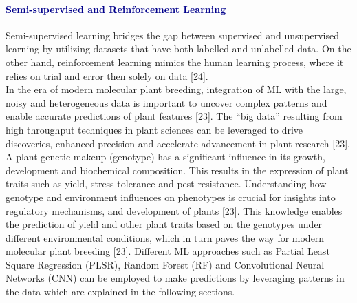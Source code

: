 \documentclass[12pt,a4paper]{report}
\begin{document}
\paragraph{\textcolor{darkblue}{Semi-supervised and Reinforcement Learning}}
Semi-supervised learning bridges the gap between supervised and unsupervised learning by utilizing datasets that have both labelled and unlabelled data. On the other hand, reinforcement learning mimics the human learning process, where it relies on trial and error then solely on data [24]. \\

In the era of modern molecular plant breeding, integration of ML with the large, noisy and heterogeneous data is important to uncover complex patterns and enable accurate predictions of plant features [23]. The “big data” resulting from high throughput techniques in plant sciences can be leveraged 
to drive discoveries, enhanced precision and accelerate advancement in plant research [23]. A plant genetic makeup (genotype) has a significant influence in its growth, development and biochemical composition. This results in the expression of plant traits such as yield, stress tolerance and pest resistance. 
Understanding how genotype and environment influences on phenotypes is crucial for insights into regulatory mechanisms, and development of plants [23]. This knowledge enables the  prediction of yield and other plant traits based on the genotypes under different environmental conditions, which in turn paves the 
way for modern molecular plant breeding [23]. Different ML approaches such as Partial Least Square Regression (PLSR), Random Forest (RF) and Convolutional Neural Networks (CNN)  can be employed to make predictions by leveraging patterns in the data which are explained in the following sections. \\
\end{document}

